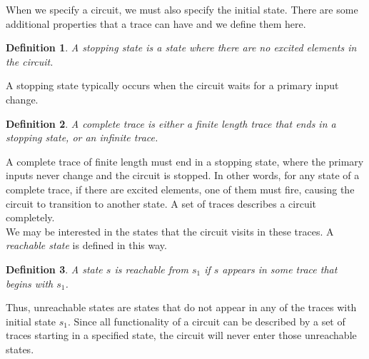 \documentclass[12pt]{report}
\newtheorem*{definition}{Definition}
\begin{document}
When we specify a circuit, we must also specify the initial state.  
There are some additional properties that a trace can have and we define them here.
\begin{definition}
A {\em stopping state} is a state where there are no excited elements in the circuit. 
\end{definition} 
A stopping state typically occurs when the circuit waits for a primary input change.
\begin{definition}
A {\em complete trace} is either a finite length trace that ends in a stopping state, or an infinite trace.
\end{definition}
A complete trace of finite length must end in a stopping state, where the primary inputs never change and the circuit is stopped.  In other words, for any state of a complete trace, if there are excited elements, one of them must fire, causing the circuit to transition to another state.
A set of traces describes a circuit completely. \\

We may be interested in the states that the circuit visits in these traces. 
A {\em reachable state} is defined in this way.
\begin{definition}
A state $s$ is {\em reachable} from $s_1$ if $s$ appears in some trace that begins with $s_1$.
\end{definition}
Thus, unreachable states are states that do not appear in any of the traces with initial state $s_1$.  Since all functionality of a circuit can be described by a set of traces starting in a specified state, the circuit will never enter those unreachable states. 
\end{document}
